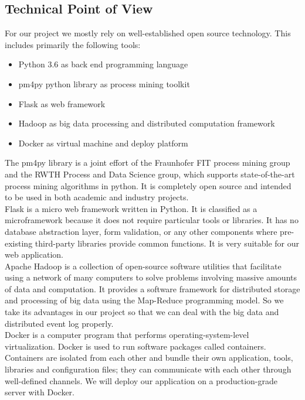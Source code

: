 \documentclass[runningheads]{llncs}
\begin{document}
\subsection{Technical Point of View}
For our project we mostly rely on well-established open source technology. This includes primarily the following tools:\\


\begin{itemize}
\item Python 3.6 as back end programming language
\item pm4py python library as process mining toolkit
\item Flask as web framework
\item Hadoop as big data processing and distributed computation framework
\item Docker as virtual machine and deploy platform
\end{itemize}

\noindent
The pm4py library is a joint effort of the Fraunhofer FIT process mining group and the RWTH Process and Data Science group, which supports state-of-the-art process mining algorithms in python. It is completely open source and intended to be used in both academic and industry projects.\\

\noindent
Flask is a micro web framework written in Python. It is classified as a microframework because it does not require particular tools or libraries. It has no database abstraction layer, form validation, or any other components where pre-existing third-party libraries provide common functions. It is very suitable for our web application.\\

\noindent
Apache Hadoop is a collection of open-source software utilities that facilitate using a network of many computers to solve problems involving massive amounts of data and computation. It provides a software framework for distributed storage and processing of big data using the Map-Reduce programming model. So we take its advantages in our project so that we can deal with the big data and distributed event log properly.\\

\noindent
Docker is a computer program that performs operating-system-level virtualization. Docker is used to run software packages called containers. Containers are isolated from each other and bundle their own application, tools, libraries and configuration files; they can communicate with each other through well-defined channels. We will deploy our application on a production-grade server with Docker.
\end{document}
